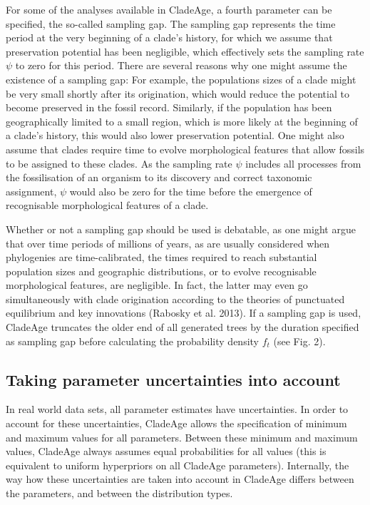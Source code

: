 \documentclass{article}
\begin{document}
For some of the analyses available in CladeAge, a fourth parameter can be specified, the so-called sampling gap. The sampling gap represents the time period at the very beginning of a clade's history, for which we assume that preservation potential has been negligible, which effectively sets the sampling rate $\psi$ to zero for this period. There are several reasons why one might assume the existence of a sampling gap: For example, the populations sizes of a clade might be very small shortly after its origination, which would reduce the potential to become preserved in the fossil record. Similarly, if the population has been geographically limited to a small region, which is more likely at the beginning of a clade's history, this would also lower preservation potential. One might also assume that clades require time to evolve morphological features that allow fossils to be assigned to these clades. As the sampling rate $\psi$ includes all processes from the fossilisation of an organism to its discovery and correct taxonomic assignment, $\psi$ would also be zero for the time before the emergence of recognisable morphological features of a clade.

Whether or not a sampling gap should be used is debatable, as one might argue that over time periods of millions of years, as are usually considered when phylogenies are time-calibrated, the times required to reach substantial population sizes and geographic distributions, or to evolve recognisable morphological features, are negligible. In fact, the latter may even go simultaneously with clade origination according to the theories of punctuated equilibrium and key innovations (Rabosky et al. 2013). If a sampling gap is used, CladeAge truncates the older end of all generated trees by the duration specified as sampling gap before calculating the probability density $f_t$ (see Fig. 2). 

\subsection{Taking parameter uncertainties into account}

In real world data sets, all parameter estimates have uncertainties. In order to account for these uncertainties, CladeAge allows the specification of minimum and maximum values for all parameters. Between these minimum and maximum values, CladeAge always assumes equal probabilities for all values (this is equivalent to uniform hyperpriors on all CladeAge parameters). Internally, the way how these uncertainties are taken into account in CladeAge differs between the parameters, and between the distribution types.
\end{document}

